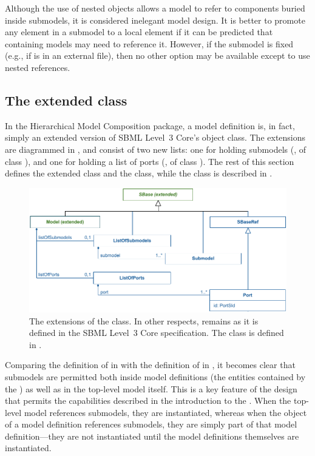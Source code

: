 Although the use of nested \SBaseRef objects allows a model to refer to
components buried inside submodels, it is considered inelegant model
design.  It is better to promote any element in a submodel to a local
element if it can be predicted that containing models may need to
reference it.  However, if the submodel is fixed (e.g., if is in an
external file), then no other option may be available except to use
nested references.


\subsection{The extended  class}
\label{model-class}
\label{listofsubmodels-class}
\label{listofports-class}

In the Hierarchical Model Composition package, a model definition is, in
fact, simply an extended version of SBML Level~3 Core's \Model object
class.  The extensions are diagrammed in , and
consist of two new lists: one for holding submodels
(, of class \ListOfSubmodels), and one for
holding a list of ports (, of class \ListOfPorts).
The rest of this section defines the extended \Model class and the \Port
class, while the \Submodel class is described in .

\begin{figure}[hbt]
  \includegraphics{figs/extended-model-uml}
  \caption{The extensions of the \Model class.  In other respects,
    \Model remains as it is defined in the SBML Level~3 Core
    specification.  The \Submodel class is defined in
    .}
  \label{extended-model-uml}
\end{figure}

Comparing the definition of \SBML in  with
the definition of \Model in , it becomes clear
that submodels are permitted both inside model definitions (the entities
contained by the \ListOfModelDefinitions) as well as in the top-level
model itself.  This is a key feature of the design that permits the
capabilities described in the introduction to the .
When the top-level model references submodels, they are instantiated,
whereas when the \Model object of a model definition references
submodels, they are simply part of that model definition---they are not
instantiated until the model definitions themselves are instantiated.


